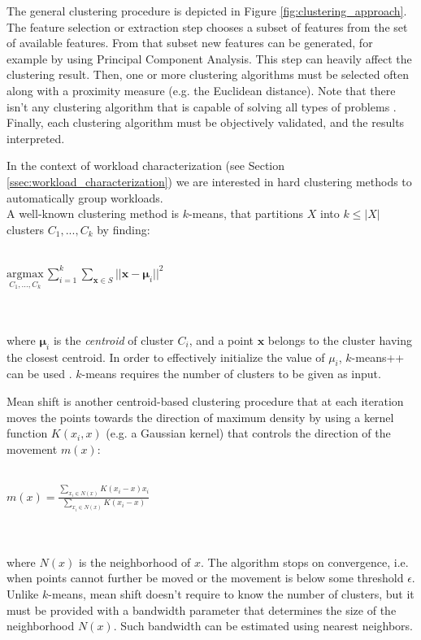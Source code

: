 \documentclass[a4paper, 12pt]{article} %
\begin{document}
	The general clustering procedure is depicted in Figure \ref{fig:clustering_approach}. The feature selection or extraction step chooses a subset of features from the set of available features. From that subset new features can be generated, for example by using Principal Component Analysis. This step can heavily affect the clustering result. Then, one or more clustering algorithms must be selected often along with a proximity measure (e.g. the Euclidean distance). Note that there isn't any clustering algorithm that is capable of solving all types of problems \cite{ImpossibleTheoremForClustering}. Finally, each clustering algorithm must be objectively validated, and the results interpreted.
	
	In the context of workload characterization (see Section \ref{ssec:workload_characterization}) we are interested in hard clustering methods to automatically group workloads. \\
	A well-known clustering method is $k$-means, that partitions $X$ into $k \leq |X|$ clusters $C_1, ..., C_k$ by finding:\\\\
	\centerline{
	$
	\underset{C_1, ..., C_k}{\mathrm{argmax}} \, \sum_{i=1}^{k} \underset{{\pmb{x} \in S}}{\sum} || \pmb{x} - \pmb{\mu}_i ||^2
	$
	} \\\\
	where $\pmb{\mu}_i$ is the \textit{centroid} of cluster $C_i$, and a point $\pmb{x}$ belongs to the cluster having the closest centroid. In order to effectively initialize the value of $\mu_i$, $k$-means++ can be used \cite{kmeans++}. $k$-means requires the number of clusters to be given as input.
	
	Mean shift \cite{MeanShift} is another centroid-based clustering procedure that at each iteration moves the points towards the direction of maximum density by using a kernel function $K(x_i, x)$ (e.g. a Gaussian kernel) that controls the direction of the movement $m(x)$:\\\\
	\centerline{
		$
		m(x) = \frac{\sum_{x_i \in N(x)} K(x_i - x)x_i}{\sum_{x_i \in N(x)} K(x_i - x)}
		$
	} \\\\
	where $N(x)$ is the neighborhood of $x$. The algorithm stops on convergence, i.e. when points cannot further be moved or the movement is below some threshold $\epsilon$. Unlike $k$-means, mean shift doesn't require to know the number of clusters, but it must be provided with a bandwidth parameter that determines the size of the neighborhood $N(x)$. Such bandwidth can be estimated using nearest neighbors.
	
\end{document}
